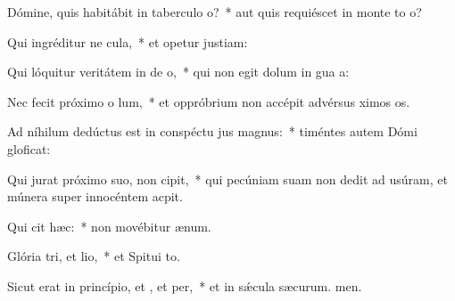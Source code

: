 \item Dómine, quis habitábit in taberculo o?~* aut quis requiéscet in monte to o?
\item Qui ingréditur ne cula,~* et opetur justiam:
\item Qui lóquitur veritátem in de o,~* qui non egit dolum in gua a:
\item Nec fecit próximo o lum,~* et oppróbrium non accépit advérsus ximos os.
\item Ad níhilum dedúctus est in conspéctu jus magnus:~* timéntes autem Dómi gloficat:
\item Qui jurat próximo suo,  non cipit,~* qui pecúniam suam non dedit ad usúram, et múnera super innocéntem  acpit.
\item Qui cit hæc:~* non movébitur  ænum.
\item Glória tri, et lio,~* et Spitui to.
\item Sicut erat in princípio, et , et per,~* et in sǽcula sæcurum. men.
